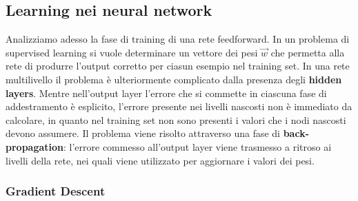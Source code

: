 \subsection{Learning nei neural network}
Analizziamo adesso la fase di training di una rete feedforward.  In un problema di supervised learning si vuole determinare un vettore dei pesi $\vec{w}$ che permetta alla rete di produrre l'output corretto per ciasun esempio nel training set.
In una rete multilivello il problema è ulteriormente complicato dalla presenza degli \textbf{hidden layers}. Mentre nell'output layer l'errore che si commette in ciascuna fase di addestramento è esplicito, l'errore presente nei livelli nascosti
non è immediato da calcolare, in quanto nel training set non sono presenti i valori che i nodi nascosti devono assumere. Il problema viene risolto attraverso una fase di \textbf{back-propagation}:
l'errore commesso all'output layer viene trasmesso a ritroso ai livelli della rete, nei quali viene utilizzato per aggiornare i valori dei pesi.
\subsubsection{Gradient Descent} 







    